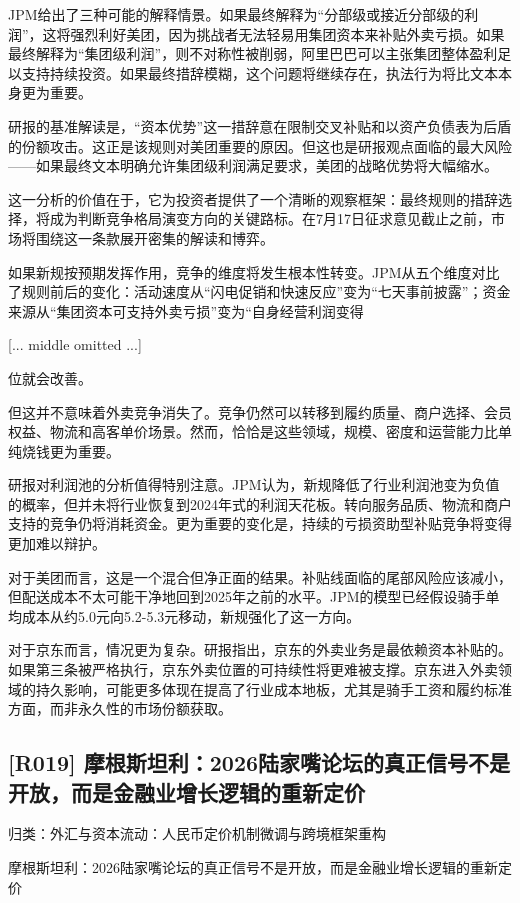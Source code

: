 \documentclass[11pt]{ctexart}
\begin{document}
JPM给出了三种可能的解释情景。如果最终解释为“分部级或接近分部级的利润”，这将强烈利好美团，因为挑战者无法轻易用集团资本来补贴外卖亏损。如果最终解释为“集团级利润”，则不对称性被削弱，阿里巴巴可以主张集团整体盈利足以支持持续投资。如果最终措辞模糊，这个问题将继续存在，执法行为将比文本本身更为重要。

研报的基准解读是，“资本优势”这一措辞意在限制交叉补贴和以资产负债表为后盾的份额攻击。这正是该规则对美团重要的原因。但这也是研报观点面临的最大风险——如果最终文本明确允许集团级利润满足要求，美团的战略优势将大幅缩水。

这一分析的价值在于，它为投资者提供了一个清晰的观察框架：最终规则的措辞选择，将成为判断竞争格局演变方向的关键路标。在7月17日征求意见截止之前，市场将围绕这一条款展开密集的解读和博弈。

如果新规按预期发挥作用，竞争的维度将发生根本性转变。JPM从五个维度对比了规则前后的变化：活动速度从“闪电促销和快速反应”变为“七天事前披露”；资金来源从“集团资本可支持外卖亏损”变为“自身经营利润变得

[... middle omitted ...]

位就会改善。

但这并不意味着外卖竞争消失了。竞争仍然可以转移到履约质量、商户选择、会员权益、物流和高客单价场景。然而，恰恰是这些领域，规模、密度和运营能力比单纯烧钱更为重要。

研报对利润池的分析值得特别注意。JPM认为，新规降低了行业利润池变为负值的概率，但并未将行业恢复到2024年式的利润天花板。转向服务品质、物流和商户支持的竞争仍将消耗资金。更为重要的变化是，持续的亏损资助型补贴竞争将变得更加难以辩护。

对于美团而言，这是一个混合但净正面的结果。补贴线面临的尾部风险应该减小，但配送成本不太可能干净地回到2025年之前的水平。JPM的模型已经假设骑手单均成本从约5.0元向5.2-5.3元移动，新规强化了这一方向。

对于京东而言，情况更为复杂。研报指出，京东的外卖业务是最依赖资本补贴的。如果第三条被严格执行，京东外卖位置的可持续性将更难被支撑。京东进入外卖领域的持久影响，可能更多体现在提高了行业成本地板，尤其是骑手工资和履约标准方面，而非永久性的市场份额获取。

\subsection{[R019] 摩根斯坦利：2026陆家嘴论坛的真正信号不是开放，而是金融业增长逻辑的重新定价}
{\small\color{refgray}归类：外汇与资本流动：人民币定价机制微调与跨境框架重构}

摩根斯坦利：2026陆家嘴论坛的真正信号不是开放，而是金融业增长逻辑的重新定价
\end{document}
